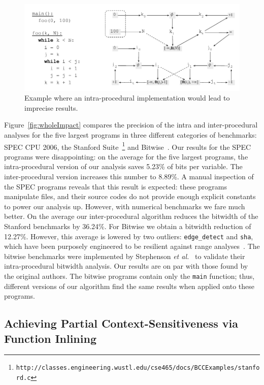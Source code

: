 \documentclass[preprint]{elsarticle}
\begin{document}
\begin{figure}[t!]
\begin{center}
\includegraphics[width=\textwidth]{images/intra}
\end{center}
\caption{\label{fig:intra}
Example where an intra-procedural implementation would lead to imprecise
results.
}
\end{figure}

Figure~\ref{fig:wholeImpact} compares the precision of the intra and
inter-procedural analyses for the five largest programs in three different
categories of benchmarks: SPEC CPU 2006, the Stanford Suite~\footnote{\texttt{http://classes.engineering.wustl.edu/cse465/docs/BCCExamples/stanford.c}} and
Bitwise~\cite{Stephenson00}.
Our results for the SPEC programs were disappointing: on the average for
the five largest programs, the intra-procedural version of our analysis saves
5.23\% of bits per variable.
The inter-procedural version increases this number to 8.89\%.
A manual inspection of the SPEC programs reveals that this result is expected:
these programs manipulate files, and their source codes do not provide enough
explicit constants to power our analysis up.
However, with numerical benchmarks we fare much better.
On the average our inter-procedural algorithm reduces the bitwidth of the
Stanford benchmarks by 36.24\%.
For Bitwise we obtain a bitwidth reduction of 12.27\%.
However, this average is lowered by two outliers: \texttt{edge\_detect} and
\texttt{sha}, which have been purposely engineered to be resilient against
range analyses~\cite{Stephenson00}.
The bitwise benchmarks were implemented by Stephenson
{\em et al.}~\cite{Stephenson00} to validate their intra-procedural bitwidth
analysis.
Our results are on par with those found by the original authors.
The bitwise programs contain only the \texttt{main} function; thus, different
versions of our algorithm find the same results when applied onto these
programs.

\subsection{Achieving Partial Context-Sensitiveness via Function Inlining}
\label{sub:context}
\end{document}
